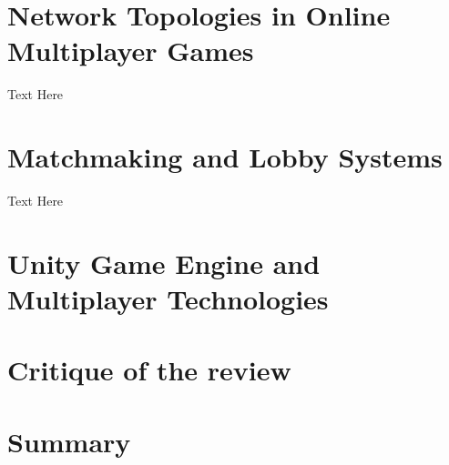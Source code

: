 \section{Network Topologies in Online Multiplayer Games }

Text Here

\section{Matchmaking and Lobby Systems}

Text Here

\section{Unity Game Engine and Multiplayer Technologies}

\section{Critique of the review} %


\section{Summary} 

